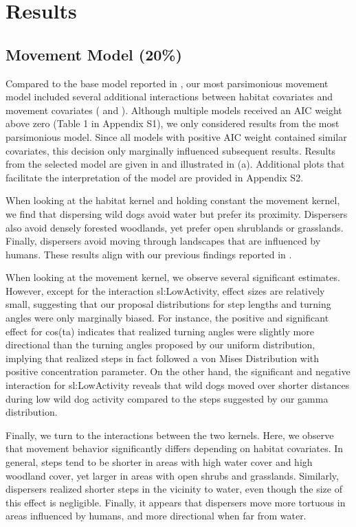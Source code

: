 \documentclass[abstract=on,10pt,a4paper,bibliography=totocnumbered]{article}
\begin{document}
\section{Results}
\subsection{Movement Model (20\%)}
Compared to the base model reported in \citep{Hofmann.2021}, our most
parsimonious movement model included several additional interactions between
habitat covariates and movement covariates ( and
). Although multiple models received an AIC weight
above zero (Table 1 in Appendix S1), we only considered results from the most
parsimonious model. Since all models with positive AIC weight contained similar
covariates, this decision only marginally influenced subsequent results. Results
from the selected model are given in  and illustrated
in  (a). Additional plots that facilitate the interpretation
of the model are provided in Appendix S2.

When looking at the habitat kernel and holding constant the movement kernel, we
find that dispersing wild dogs avoid water but prefer its proximity. Dispersers
also avoid densely forested woodlands, yet prefer open shrublands or grasslands.
Finally, dispersers avoid moving through landscapes that are influenced by
humans. These results align with our previous findings reported in
\cite{Hofmann.2021}.

When looking at the movement kernel, we observe several significant estimates.
However, except for the interaction \textsf{sl:LowActivity}, effect sizes are
relatively small, suggesting that our proposal distributions for step lengths
and turning angles were only marginally biased. For instance, the positive and
significant effect for \textsf{cos(ta)} indicates that realized turning angles
were slightly more directional than the turning angles proposed by our uniform
distribution, implying that realized steps in fact followed a von Mises
Distribution with positive concentration parameter. On the other hand, the
significant and negative interaction for \textsf{sl:LowActivity} reveals that
wild dogs moved over shorter distances during low wild dog activity compared to
the steps suggested by our gamma distribution.

Finally, we turn to the interactions between the two kernels. Here, we observe
that movement behavior significantly differs depending on habitat covariates. In
general, steps tend to be shorter in areas with high water cover and high
woodland cover, yet larger in areas with open shrubs and grasslands. Similarly,
dispersers realized shorter steps in the vicinity to water, even though the size
of this effect is negligible. Finally, it appears that dispersers move more
tortuous in areas influenced by humans, and more directional when far from
water.
\end{document}
